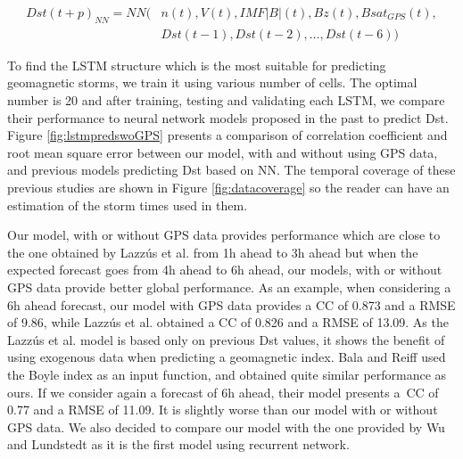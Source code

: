 \begin{equation}\label{eq:dstmodel}
	\begin{aligned}
		Dst \left( t+p \right)_{NN} = NN ( 
			& n \left( t \right) , V \left( t \right) , IMF \vert B \vert  \left( t \right) ,Bz \left( t \right) , Bsat_{GPS} \left( t \right) , \\ 
			&	Dst \left( t-1 \right) ,Dst \left( t-2 \right) , \ldots ,Dst \left( t-6 \right) )
	\end{aligned}
\end{equation}

To find the LSTM structure which is the most suitable for predicting geomagnetic storms, we train it 
using various number of cells. The optimal number is 20 and after training, testing and validating each 
LSTM, we compare their performance to neural network models proposed in the past to predict Dst. 
Figure \ref{fig:lstmpredswoGPS} presents a  comparison of correlation coefficient and root mean square error 
between our model, with and without using GPS data, and previous models predicting Dst based on NN. 
The temporal coverage of these previous studies are shown in Figure \ref{fig:datacoverage} so the reader 
can have an estimation of the storm times used in them. 



Our model, with or without GPS data provides performance which are close to the one obtained by 
Lazzús et al. \cite{Lazzus} from 1h ahead to 3h ahead but when the expected forecast goes from 4h ahead to 6h ahead, 
our models, with or without GPS data provide better global performance. As an example, when considering a 6h 
ahead forecast, our model with GPS data provides a CC of 0.873 and a RMSE of 9.86, while Lazzús et al. \cite{Lazzus} 
obtained a CC of 0.826 and a RMSE of 13.09. As the Lazzús et al. \cite{Lazzus} model is based only on 
previous Dst values, it shows the benefit of using exogenous data when predicting a geomagnetic index. 
Bala and Reiff \cite{Bala2012} used the Boyle index as an input function, and obtained quite similar 
performance as ours. If we consider again a forecast of 6h ahead, their model presents a\ CC of 0.77 
and a RMSE of 11.09. It is slightly worse than our model with or without GPS data. We also decided to compare 
our model with the one provided by Wu and Lundstedt \cite{wu1997geomagnetic} as it is the first model using 
recurrent network. 

